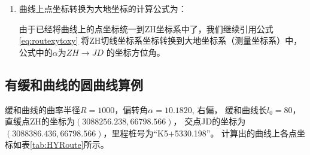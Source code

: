 \begin{enumerate}
          公式\ref{eq:routeHZtoZH}中的$(x_{HZ}, y_{HZ})$为HZ点在ZH坐标系中的坐标，其值为：

          \begin{equation}
              \left .
              \begin{aligned}
                  x_{HZ} & = T (1 +  \cos \alpha) \\
                  y_{HZ} & =  T \sin \alpha
              \end{aligned}
              \right \}
              \label{eq:routeHZXY}
          \end{equation}

          也可以不用公式\ref{eq:routeHZtoZH}，直接将$\alpha+180\degree$代入到
          公式\ref{eq:routexytoxy}中进行计算。

          在以上计算中，我们以曲线右偏为例的，如果曲线左偏，同样的方法建立坐标系，
          x坐标是相同的， y坐标乘以 -1 即可。

    \item 曲线上点坐标转换为大地坐标的计算公式为：

          由于已经将曲线上的点坐标统一到ZH坐标系中了，我们继续引用公式\ref{eq:routexytoxy}
          将ZH切线坐标系坐标转换到大地坐标系（测量坐标系）中，公式中的$\alpha$为$ZH \rightarrow JD$
          的坐标方位角。

\end{enumerate}


\subsection{有缓和曲线的圆曲线算例}

缓和曲线的曲率半径$R=1000$，偏转角$\alpha =10.1820$, 右偏，
缓和曲线长$l_0=80$，直缓点ZH的坐标为$(3088256.238, 66798.566)$，
交点JD的坐标为$(3088386.436, 66798.566)$，里程桩号为``K5+5330.198''。
计算出的曲线上各点坐标如表\ref{tab:HYRoute}所示。

